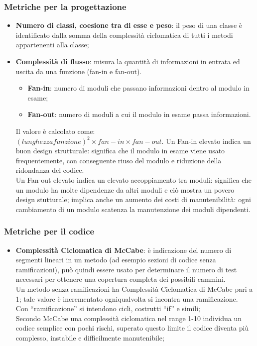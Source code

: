 \subsubsection{Metriche per la progettazione}{
	\begin{itemize}
		\item \textbf{Numero di classi, coesione tra di esse e peso}: il peso di una classe è identificato dalla somma della complessità ciclomatica di tutti i metodi appartenenti alla classe;
	 	\item \textbf{Complessità di flusso}: misura la quantità di informazioni in	entrata ed uscita da una funzione (fan-in e fan-out).\\
	 	\begin{itemize}
	 	 \item \textbf{Fan-in}: numero di moduli che passano informazioni dentro al modulo in esame;
	 	 \item \textbf{Fan-out}: numero di moduli a cui il modulo in esame passa informazioni.
	 	\end{itemize}
	 	Il valore è calcolato come:\\
	 	$(lunghezzafunzione)^2\times fan-in \times fan-out.$
	 	Un Fan-in elevato indica un buon design strutturale: significa che il modulo in esame viene usato frequentemente, con conseguente riuso del modulo e riduzione della ridondanza del codice.\\
	 	Un Fan-out elevato indica un elevato accoppiamento tra moduli: significa che un modulo ha molte dipendenze da altri moduli e ciò mostra un povero design stutturale;
	 	implica anche un aumento dei costi di manutenibilità: ogni cambiamento di un modulo scatenza la manutenzione dei moduli dipendenti.
	 	
	 	
	 	
	 	
	 	
	\end{itemize}
\subsubsection{Metriche per il codice}{
	\begin{itemize}
		\item \textbf{Complessità Ciclomatica di McCabe}: è indicazione del numero di segmenti lineari in un metodo (ad esempio sezioni di codice senza ramificazioni), può quindi essere usato per determinare il numero di test necessari per ottenere una copertura completa dei possibili cammini.  \\
		Un metodo senza ramificazioni ha Complessità Ciclomatica di McCabe pari a 1; tale valore è incrementato ogniqualvolta si incontra una ramificazione.  \\
		Con “ramificazione” si intendono cicli, costrutti “if” e simili;\\
		Secondo McCabe una complessità ciclomatica nel range 1-10 individua un codice semplice con pochi rischi, superato questo limite il codice diventa più complesso, instabile e difficilmente manutenibile;
		

\end{itemize}}}
